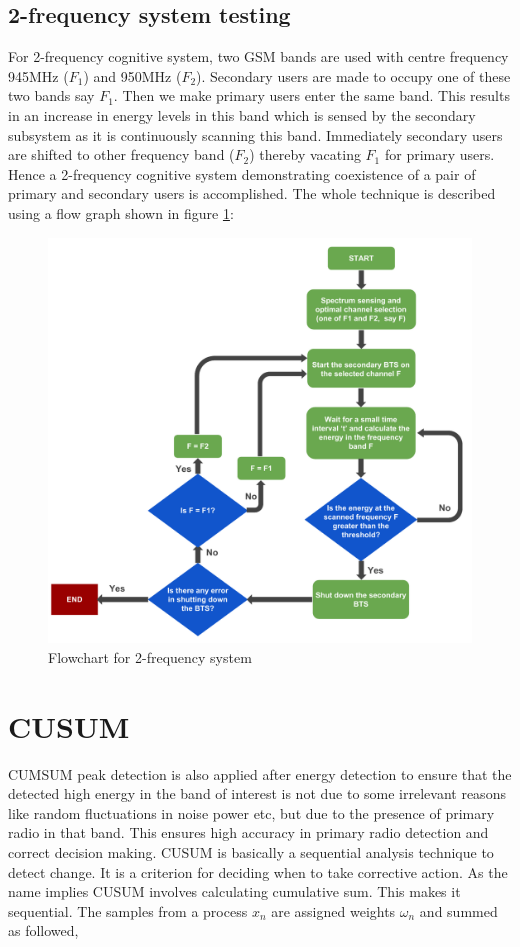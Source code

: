 \subsection{2-frequency system testing}
For 2-frequency cognitive system, two GSM bands are used with centre 
frequency 945MHz ($F_1$) and 950MHz ($F_2$). Secondary users are made to occupy 
one of these two bands say $F_1$. Then we make primary users enter the same 
band. This results in an increase in energy levels in this band which is sensed 
by the secondary subsystem as it is continuously scanning this band. 
Immediately secondary users are shifted to other frequency band ($F_2$) thereby 
vacating $F_1$ for primary users. Hence a 2-frequency cognitive system 
demonstrating coexistence of a pair of primary and secondary users is 
accomplished. 
The whole technique is described using a flow graph shown in figure
\ref{freqSys2}:

\begin{figure}[!h]
\centering
\includegraphics[width=1\textwidth]{../images/freqSys2}
\caption[2-frequency system]{Flowchart for 2-frequency system}
\label{freqSys2}
\end{figure}




\section{CUSUM}
CUMSUM peak detection is also applied after energy detection to ensure that the
detected high energy in the band of interest is not due to some irrelevant 
reasons like random fluctuations in noise power etc, but due to the presence of 
primary radio in that band. This ensures high accuracy in primary radio 
detection and correct decision making.
CUSUM is basically a sequential analysis technique to detect change. 
It is a criterion for deciding when to take corrective action. As the name 
implies CUSUM involves calculating cumulative sum. This makes it sequential. 
The samples from a process $x_n$  are assigned weights $\omega_n$  and summed 
as followed,

